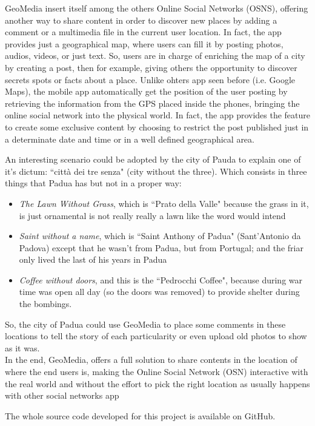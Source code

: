 \documentclass[conference]{IEEEtran}
\begin{document}
GeoMedia insert itself among the others Online Social Networks (OSNS), offering another way to share content in order to discover new places by adding a comment or a multimedia file in the current user location.
In fact, the app provides just a geographical map, where users can fill it by posting photos, audios, videos, or just text. So, users are in charge of enriching the map of a city by creating a post, then for example, giving others the opportunity to discover secrets spots or facts about a place.
Unlike ohters app seen before (i.e. Google Maps), the mobile app automatically get the position of the user posting by retrieving the information from the GPS placed inside the phones, bringing the online social network into the physical world. In fact, the app provides the feature to create some exclusive content by choosing to restrict the post published just in a determinate date and time or in a well defined geographical area.

An interesting scenario could be adopted by the city of Pauda to explain one of it's dictum: ``città dei tre senza" (city without the three).
Which consists in three things that Padua has but not in a proper way:
\begin{itemize}
    \item \textit{The Lawn Without Grass}, which is ``Prato della Valle" because the grass in it, is just ornamental is not really really a lawn like the word would intend
    \item \textit{Saint without a name}, which is ``Saint Anthony of Padua" (Sant'Antonio da Padova) except that he wasn't from Padua, but from Portugal; and the friar only lived the last of his years in Padua
    \item \textit{Coffee without doors}, and this is the ``Pedrocchi Coffee", because during war time was open all day (so the doors was removed) to provide shelter during the bombings.
\end{itemize}
So, the city of Padua could use GeoMedia to place some comments in these locations to tell the story of each particularity or even upload old photos to show as it was.
\\

In the end, GeoMedia, offers a full solution to share contents in the location of where the end users is, making the Online Social Network (OSN) interactive with the real world and without the effort to pick the right location as usually happens with other social networks app

The whole source code developed for this project is available on GitHub. \cite{gh}
\end{document}
